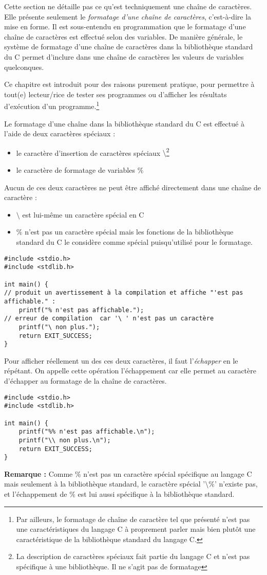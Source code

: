 \documentclass[../../../main.tex]{subfiles}
\begin{document}
Cette section ne détaille pas ce qu'est techniquement une chaîne de caractères. Elle présente seulement le \textit{formatage d'une chaîne de caractères}, c'est-à-dire la mise en forme. Il est sous-entendu en programmation que le formatage d'une chaîne de caractères est effectué selon des variables. De manière générale, le système de formatage d'une chaîne de caractères dans la bibliothèque standard du C permet d'inclure dans une chaîne de caractères les valeurs de variables quelconques.
 
Ce chapitre est introduit pour des raisons purement pratique, pour permettre à tout(e) lecteur/rice de tester ses programmes ou d'afficher les résultats d'exécution d'un programme.\footnote{Par ailleurs, le formatage de chaîne de caractère tel que présenté n'est pas une caractéristiques du langage C à proprement parler mais bien plutôt une caractéristique de la bibliothèque standard du langage C.}

Le formatage d'une chaîne dans la bibliothèque standard du C est effectué à l'aide de deux caractères spéciaux :
\begin{itemize}
	\item le caractère d'insertion de caractères spéciaux $\setminus$\footnote{La description de caractères spéciaux fait partie du langage C et n'est pas spécifique à une bibliothèque. Il ne s'agit pas de formatage}
	\item le caractère de formatage de variables $\%$
\end{itemize}
Aucun de ces deux caractères ne peut être affiché directement dans une chaîne de caractère :
\begin{itemize}
	\item $\setminus$ est lui-même un caractère spécial en C
	\item $\%$ n'est pas un caractère spécial mais les fonctions de la bibliothèque standard du C le considère comme spécial puisqu'utilisé pour le formatage.
\end{itemize}
\begin{verbatim}
#include <stdio.h>
#include <stdlib.h>

int main() {
// produit un avertissement à la compilation et affiche "'est pas affichable." :
	printf("% n'est pas affichable."); 
// erreur de compilation  car '\ ' n'est pas un caractère
	printf("\ non plus.");
	return EXIT_SUCCESS;
}
\end{verbatim}
Pour afficher réellement un des ces deux caractères, il faut l'\textit{échapper} en le répétant. On appelle cette opération l'échappement car elle permet au caractère d'échapper au formatage de la chaîne de caractères.
\begin{verbatim}
#include <stdio.h>
#include <stdlib.h>

int main() {
	printf("%% n'est pas affichable.\n");
	printf("\\ non plus.\n");
	return EXIT_SUCCESS;
}
\end{verbatim}
\textbf{Remarque :} Comme $\%$ n'est pas un caractère spécial spécifique au langage C mais seulement à la bibliothèque standard, le caractère spécial '$\setminus \%$' n'existe pas, et l'échappement de $\%$ est lui aussi spécifique à la bibliothèque standard.
\end{document}
